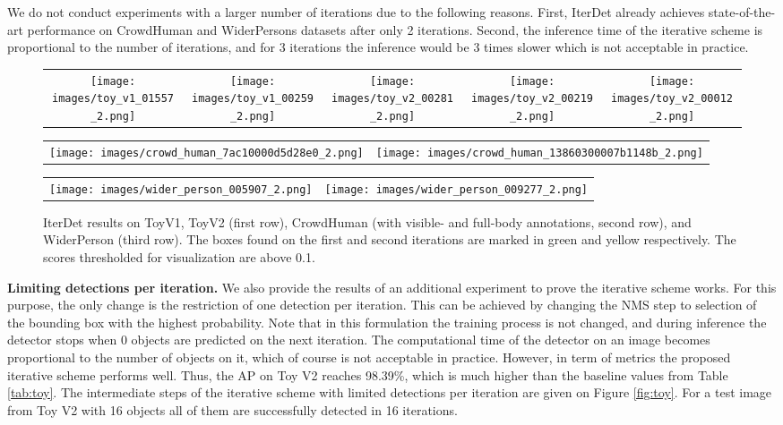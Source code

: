 \documentclass[runningheads]{llncs}
\begin{document}
We do not conduct experiments with a larger number of iterations due to the following reasons. First, IterDet already achieves state-of-the-art performance on CrowdHuman and WiderPersons datasets after only 2 iterations. Second, the inference time of the iterative scheme is proportional to the number of iterations, and for 3 iterations the inference would be 3 times slower which is not acceptable in practice.

\begin{figure*}[t]
\centering
\setlength{\tabcolsep}{2pt}
\renewcommand{\arraystretch}{0.75}
\begin{tabular}{ccccc}
    \texttt{[image: images/toy\_v1\_01557\_2.png]} &
    \texttt{[image: images/toy\_v1\_00259\_2.png]} &
    \texttt{[image: images/toy\_v2\_00281\_2.png]} &
    \texttt{[image: images/toy\_v2\_00219\_2.png]} &
    \texttt{[image: images/toy\_v2\_00012\_2.png]} \\
\end{tabular}
\begin{tabular}{cc}
    \texttt{[image: images/crowd\_human\_7ac10000d5d28e0\_2.png]} &
    \texttt{[image: images/crowd\_human\_13860300007b1148b\_2.png]} \\
\end{tabular}
\begin{tabular}{cc}
    \texttt{[image: images/wider\_person\_005907\_2.png]} &
    \texttt{[image: images/wider\_person\_009277\_2.png]} \\
\end{tabular}
\caption{IterDet results on ToyV1, ToyV2 (first row), CrowdHuman (with visible- and full-body annotations, second row), and WiderPerson (third row). The boxes found on the first and second iterations are marked in green and yellow respectively. The scores thresholded for visualization are above 0.1.}
\label{fig:examples}
\end{figure*}

\textbf{Limiting detections per iteration.} We also provide the results of an additional experiment to prove the iterative scheme works. For this purpose, the only change is the restriction of one detection per iteration. This can be achieved by changing the NMS step to selection of the bounding box with the highest probability. Note that in this formulation the training process is not changed, and during inference the detector stops when 0 objects are predicted on the next iteration. The computational time of the detector on an image becomes proportional to the number of objects on it, which of course is not acceptable in practice. However, in term of metrics the proposed iterative scheme performs well. Thus, the AP on Toy V2 reaches 98.39\%, which is much higher than the baseline values from Table \ref{tab:toy}. The intermediate steps of the iterative scheme with limited detections per iteration are given on Figure \ref{fig:toy}. For a test image from Toy V2 with 16 objects all of them are successfully detected in 16 iterations.
\end{document}
